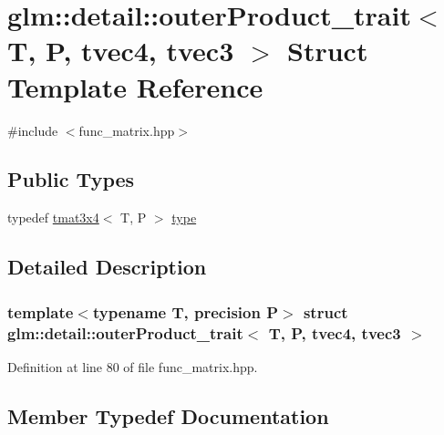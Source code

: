 \hypertarget{structglm_1_1detail_1_1outer_product__trait_3_01_t_00_01_p_00_01tvec4_00_01tvec3_01_4}{}\section{glm\+::detail\+::outer\+Product\+\_\+trait$<$ T, P, tvec4, tvec3 $>$ Struct Template Reference}
\label{structglm_1_1detail_1_1outer_product__trait_3_01_t_00_01_p_00_01tvec4_00_01tvec3_01_4}


{\ttfamily \#include $<$func\+\_\+matrix.\+hpp$>$}

\subsection*{Public Types}
\begin{DoxyCompactItemize}
\item 
typedef \mbox{\hyperlink{structglm_1_1tmat3x4}{tmat3x4}}$<$ T, P $>$ \mbox{\hyperlink{structglm_1_1detail_1_1outer_product__trait_3_01_t_00_01_p_00_01tvec4_00_01tvec3_01_4_a1e1df085b79e67665ed53cb59d80af07}{type}}
\end{DoxyCompactItemize}


\subsection{Detailed Description}
\subsubsection*{template$<$typename T, precision P$>$\newline
struct glm\+::detail\+::outer\+Product\+\_\+trait$<$ T, P, tvec4, tvec3 $>$}



Definition at line 80 of file func\+\_\+matrix.\+hpp.



\subsection{Member Typedef Documentation}
\mbox{\label{structglm_1_1detail_1_1outer_product__trait_3_01_t_00_01_p_00_01tvec4_00_01tvec3_01_4_a1e1df085b79e67665ed53cb59d80af07}} 
